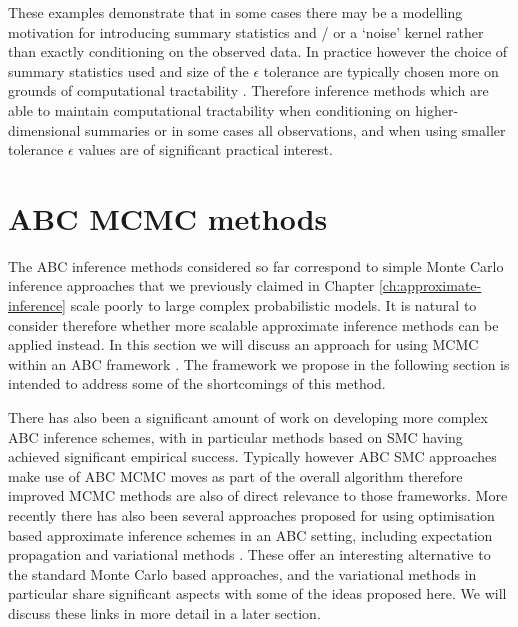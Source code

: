 These examples demonstrate that in some cases there may be a modelling motivation for introducing summary statistics and / or a `noise' kernel rather than exactly conditioning on the observed data. In practice however the choice of summary statistics used and size of the $\epsilon$ tolerance are typically chosen more on grounds of computational tractability \citep{marin2012approximate,robert2010model,prangle2015summary}. Therefore inference methods which are able to maintain computational tractability when conditioning on higher-dimensional summaries or in some cases all observations, and when using smaller tolerance $\epsilon$ values are of significant practical interest.


\section{ABC MCMC methods}

The \ac{ABC} inference methods considered so far correspond to simple Monte Carlo inference approaches that we previously claimed in Chapter \ref{ch:approximate-inference} scale poorly to large complex probabilistic models. It is natural to consider therefore whether more scalable approximate inference methods can be applied instead. In this section we will discuss an approach for using \ac{MCMC} within an \ac{ABC} framework \citep{marjoram2003markov,sisson2011likelihood}. The framework we propose in the following section is intended to address some of the shortcomings of this method. 

There has also been a significant amount of work on developing more complex \ac{ABC} inference schemes, with in particular methods based on \ac{SMC} \citep{sisson2007sequential,toni2009approximate,beaumont2009adaptive,del2012adaptive} having achieved significant empirical success. %
Typically however \ac{ABC} \ac{SMC} approaches make use of \ac{ABC} \ac{MCMC} moves as part of the overall algorithm therefore improved \ac{MCMC} methods are also of direct relevance to those frameworks. More recently there has also been several approaches proposed for using optimisation based approximate inference schemes in an \ac{ABC} setting, including  expectation propagation \citep{barthelme2014expectation} and variational methods \citep{tran2017variational,moreno2016automatic}. These offer an interesting alternative to the standard Monte Carlo based approaches, and the variational methods in particular share significant aspects with some of the ideas proposed here. We will discuss these links in more detail in a later section.

